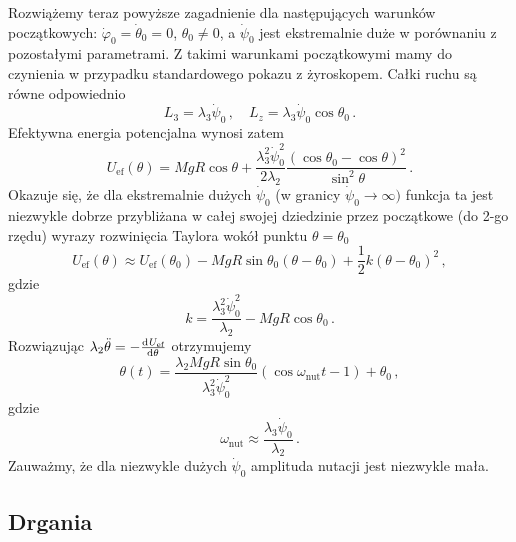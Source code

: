 \documentclass[../main.tex]{subfiles}
\begin{document}
\begin{itemize}
    Rozwiążemy teraz powyższe zagadnienie dla następujących warunków początkowych:
    \(\dot{\varphi}_0=\dot{\theta}_0=0\), \(\theta_0\neq0\), a \(\dot{\psi}_0\) jest ekstremalnie
    duże w porównaniu z pozostałymi parametrami. Z takimi warunkami początkowymi mamy do czynienia w
    przypadku standardowego pokazu z żyroskopem. Całki ruchu są równe odpowiednio
    \begin{equation*}
        L_3=\lambda_3\dot{\psi}_0\,,\quad L_z=\lambda_3\dot{\psi}_0\cos\theta_0\,.
    \end{equation*}
    Efektywna energia potencjalna wynosi zatem
    \begin{equation*}
        U_\text{ef}(\theta)=MgR\cos\theta+\frac{\lambda_3^2\dot{\psi}_0^2}{2\lambda_2}\frac{(\cos\theta_0-\cos\theta)^2}{\sin^2\theta}\,.
    \end{equation*}
    Okazuje się, że dla ekstremalnie dużych \(\dot{\psi}_0\) (w granicy \(\dot{\psi}_0\to\infty)\)
    funkcja ta jest niezwykle dobrze przybliżana w całej swojej dziedzinie przez początkowe (do 2-go
    rzędu) wyrazy rozwinięcia Taylora wokół punktu \(\theta=\theta_0\)
    \begin{equation*}
        U_\text{ef}(\theta)\approx U_\text{ef}(\theta_0)-MgR\sin\theta_0(\theta-\theta_0)+\frac{1}{2}k(\theta-\theta_0)^2\,,
    \end{equation*}
    gdzie 
    \begin{equation*}
        k=\frac{\lambda_3^2\dot{\psi}_0^2}{\lambda_2}-MgR\cos\theta_0\,.
    \end{equation*}
    Rozwiązując \(\lambda_2\ddot\theta=-\dv[]{U_\text{ef}}{\theta}\) otrzymujemy
    \begin{equation*}
        \theta(t)=\frac{\lambda_2MgR\sin\theta_0}{\lambda_3^2\dot{\psi}_0^2}(\cos\omega_\text{nut}t-1)+\theta_0\,,
    \end{equation*}
    gdzie
    \begin{equation*}
        \omega_\text{nut}\approx \frac{\lambda_3\dot{\psi}_0}{\lambda_2}\,.
    \end{equation*}
    Zauważmy, że dla niezwykle dużych \(\dot{\psi}_0\) amplituda nutacji jest niezwykle mała.
    \end{itemize}

    \subsection{Drgania}
\end{document}
